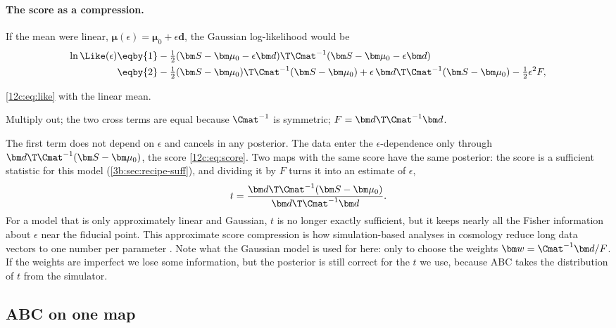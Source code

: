 \paragraph{The score as a compression.} If the mean were linear, $\bm\mu(\epsilon)=\bm\mu_0+\epsilon\bm d$, the Gaussian log-likelihood
would be
\begin{align}
  \ln\Like(\epsilon)
  &\eqby{1}-\tfrac12(\bm S-\bm\mu_0-\epsilon\bm d)\T\Cmat^{-1}(\bm S-\bm\mu_0-\epsilon\bm d)\nonumber\\
  &\eqby{2}-\tfrac12(\bm S-\bm\mu_0)\T\Cmat^{-1}(\bm S-\bm\mu_0)+\epsilon\,\bm d\T\Cmat^{-1}(\bm S-\bm\mu_0)-\tfrac12\epsilon^2F ,
  \label{12c:eq:sufficient}
\end{align}
\begin{explain}
  \item \eqref{12c:eq:like} with the linear mean.
  \item Multiply out; the two cross terms are equal because $\Cmat^{-1}$ is symmetric; $F=\bm d\T\Cmat^{-1}\bm d$.
\end{explain}
The first term does not depend on $\epsilon$ and cancels in any posterior. The data enter the $\epsilon$-dependence only through
$\bm d\T\Cmat^{-1}(\bm S-\bm\mu_0)$, the score \eqref{12c:eq:score}. Two maps with the same score have the same posterior: the score
is a sufficient statistic for this model (\cref{3b:sec:recipe-suff}), and dividing it by $F$ turns it into an estimate of $\epsilon$,
\begin{equation}
  t=\frac{\bm d\T\Cmat^{-1}(\bm S-\bm\mu_0)}{\bm d\T\Cmat^{-1}\bm d} .
  \label{12c:eq:tcomp}
\end{equation}
For a model that is only approximately linear and Gaussian, $t$ is no longer exactly sufficient, but it keeps nearly all the Fisher
information about $\epsilon$ near the fiducial point. This approximate score compression is how simulation-based analyses in cosmology
reduce long data vectors to one number per parameter \cite{Alsing2019}. Note what the Gaussian model is used for here: only to choose
the weights $\bm w=\Cmat^{-1}\bm d/F$. If the weights are imperfect we lose some information, but the posterior is still correct for the
$t$ we use, because ABC takes the distribution of $t$ from the simulator.

\subsection{ABC on one map}
\label{12c:sec:abc-run}

